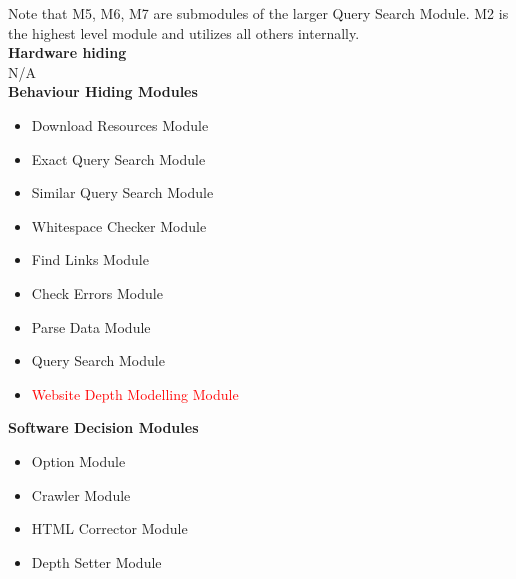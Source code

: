 \documentclass[titlepage]{article}
\begin{document}
Note that M5, M6, M7 are submodules of the larger Query Search Module. M2 is the highest level module and utilizes all others internally.\\

\textbf{Hardware hiding}\\

N/A\\

\textbf{Behaviour Hiding Modules}

\begin{itemize}
\item{Download Resources Module}\\
\item{Exact Query Search Module}\\
\item{Similar Query Search Module}\\
\item{Whitespace Checker Module}\\
\item{Find Links Module}\\
\item{Check Errors Module}\\
\item{Parse Data Module}\\
\item{Query Search Module}\\
\item\textcolor{red}{Website Depth Modelling Module}\\
\end{itemize}

\textbf{Software Decision Modules}

\begin{itemize}
\item{Option Module}\\
\item{Crawler Module}\\
\item{HTML Corrector Module}\\
\item{Depth Setter Module}\\
\end{itemize}
\end{document}
